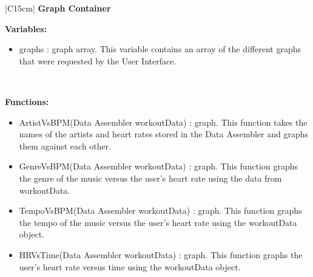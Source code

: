 \documentclass[letterpaper,english, 12pt]{scrreprt}
\begin{document}
\begin{center}
        \begin{tabular}{|C{15cm}|}
                \hline
                        \textbf{Graph Container} \\
                \hline
                        \begin{flushleft}
                                \textbf{Variables:} \\
                        \end{flushleft}
                                \begin{itemize}
                                        \item graphs : graph array. This variable contains an array of the different graphs that were requested by the User Interface.
                                \end{itemize} \\
                        \hline
                        \begin{flushleft}
                                \textbf{Functions: } \\
                        \end{flushleft}
                                \begin{itemize}
                                        \item ArtistVsBPM(Data Assembler workoutData) : graph. This function takes the names of the artists and heart rates stored in the Data Assembler and graphs them against each other.
                                        \item GenreVsBPM(Data Assembler workoutData) : graph. This function graphs the genre of the music versus the user's heart rate using the data from workoutData.
                                        \item TempoVsBPM(Data Assembler workoutData) : graph. This function graphs the tempo of the music versus the user's heart rate using the workoutData object.
                                        \item HRVsTime(Data Assembler workoutData) : graph. This function graphs the user's heart rate versus time using the workoutData object.
                                \end{itemize} \\
                        \hline
        \end{tabular}
\end{center}
\end{document}
